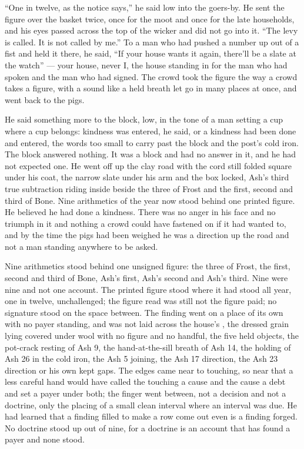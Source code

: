 “One in twelve, as the notice says,” he said low into the goers-by. He sent the figure over the basket twice, once for the moot and once for the late households, and his eyes passed across the top of the wicker and did not go into it. “The levy is called. It is not called by me.” To a man who had pushed a number up out of a fist and held it there, he said, “If your house wants it again, there'll be a slate at the watch” --- your house, never I, the house standing in for the man who had spoken and the man who had signed. The crowd took the figure the way a crowd takes a figure, with a sound like a held breath let go in many places at once, and went back to the pigs.

He said something more to the block, low, in the tone of a man setting a cup where a cup belongs: kindness was entered, he said, or a kindness had been done and entered, the words too small to carry past the block and the post's cold iron. The block answered nothing. It was a block and had no answer in it, and he had not expected one. He went off up the clay road with the cord still folded square under his coat, the narrow slate under his arm and the box locked, Ash's third true subtraction riding inside beside the three of Frost and the first, second and third of Bone. Nine arithmetics of the year now stood behind one printed figure. He believed he had done a kindness. There was no anger in his face and no triumph in it and nothing a crowd could have fastened on if it had wanted to, and by the time the pigs had been weighed he was a direction up the road and not a man standing anywhere to be asked.

Nine arithmetics stood behind one unsigned figure: the three of Frost, the first, second and third of Bone, Ash's first, Ash's second and Ash's third. Nine were nine and not one account. The printed figure stood where it had stood all year, one in twelve, unchallenged; the figure read was still not the figure paid; no signature stood on the space between. The finding went on a place of its own with no payer standing, and was not laid across the house's , the dressed grain lying covered under wool with no figure and no handful, the five held objects, the pot-crack resting of Ash 9, the hand-at-the-sill breath of Ash 14, the holding of Ash 26 in the cold iron, the Ash 5 joining, the Ash 17 direction, the Ash 23 direction or his own kept gaps. The edges came near to touching, so near that a less careful hand would have called the touching a cause and the cause a debt and set a payer under both; the finger went between, not a decision and not a doctrine, only the placing of a small clean interval where an interval was due. He had learned that a finding filled to make a row come out even is a finding forged. No doctrine stood up out of nine, for a doctrine is an account that has found a payer and none stood.

